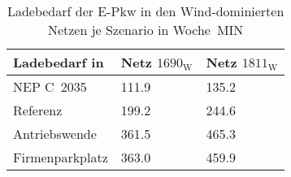 {
\renewcommand{\arraystretch}{1.2}%
\begin{table}[H]
	\begin{center}
		\caption{Ladebedarf der E-Pkw in den Wind-dominierten Netzen je Szenario in Woche~MIN}
		\begin{tabu} to 0.6\textwidth {X[1.5] X[1, r] X[1, r]}
			\toprule
			Ladebedarf in   \si{\mwh}    & Netz \(1690_{\text{W}}\) & Netz \(1811_{\text{W}}\) \\ \midrule
			NEP C~\num{2035}             & \num{111.9}     & \num{135.2}     \\
			Referenz                     & \num{199.2}     & \num{244.6}     \\
			Antriebswende                & \num{361.5}     & \num{465.3}     \\
			\glqq Firmenparkplatz\grqq{} & \num{363.0}     & \num{459.9}     \\ \bottomrule
		\end{tabu}
		\label{tab:wind_dominated_epkw_demand}
	\end{center}
	\vspace{-3mm}%
\end{table}
}